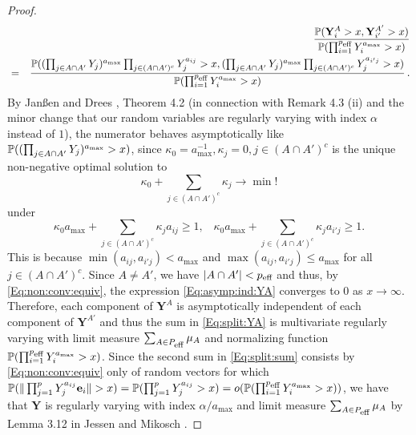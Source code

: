 \begin{proof}
\begin{eqnarray}\label{Eq:asymp:ind:YA} && \frac{\P(\mathbf{Y}^A_i>x,\mathbf{Y}^{A'}_{i'}>x)}{\P(\prod_{i=1}^{p_{\mbox{\scriptsize eff}}}Y_i^{a_{\max}}>x)}\\
\nonumber &=& \frac{\P((\prod_{j \in A \cap A'}Y_j)^{a_{\max}}\prod_{j \in (A \cap A')^c}Y_j^{a_{ij}}>x,(\prod_{j \in A \cap A'}Y_j)^{a_{\max}}\prod_{j \in (A \cap A')^c}Y_j^{a_{i'j}}>x)}{\P(\prod_{i=1}^{p_{\mbox{\scriptsize eff}}}Y_i^{a_{\max}}>x)}\,. 
\end{eqnarray}
By Jan\ss en and Drees \cite{janssen:drees:2016}, Theorem 4.2 (in connection with Remark 4.3 (ii) and the minor 
change that our random variables are regularly varying with index $\alpha$ instead of $1$), the numerator behaves asymptotically like $\P((\prod_{j \in A \cap A'}Y_j)^{a_{\max}}>x)$, since $\kappa_0=a_{\max}^{-1}, \kappa_{j}=0, j \in (A \cap A')^c$ is the unique non-negative optimal solution to
$$ \kappa_0+\sum_{j \in (A \cap A')^c} \kappa_j \to \min ! $$
under
$$\kappa_0 a_{\max}+\sum_{j \in (A \cap A')^c}\kappa_j a_{ij}\geq 1, \;\;\;  \kappa_0 a_{\max}+\sum_{j \in (A \cap A')^c}\kappa_j a_{i'j}\geq 1.$$
This is because $\min(a_{ij},a_{i'j})<a_{\max}$ and $\max(a_{ij},a_{i'j})\leq a_{\max}$ for all $j \in (A \cap A')^c$. Since $A \neq A'$, we have $|A \cap A'|<p_{\mbox{\scriptsize eff}}$ and thus, by \eqref{Eq:non:conv:equiv}, the expression \eqref{Eq:asymp:ind:YA} converges to 0 as $x \to \infty$. Therefore, each component of $\mathbf{Y}^A$ is asymptotically independent of each component of $\mathbf{Y}^{A'}$ and thus the sum in \eqref{Eq:split:YA} is multivariate regularly varying with limit measure $\sum_{A \in P_{\mbox{\scriptsize eff}}}\mu_A$ and normalizing function $\P(\prod_{i=1}^{p_{\mbox{\scriptsize eff}}}Y_i^{a_{\max}}>x)$. Since the second sum in \eqref{Eq:split:sum} consists by \eqref{Eq:non:conv:equiv} only of random vectors for which $\P(\|\prod_{j=1}^p Y_j^{a_{ij}} \mathbf{e}_i\|>x)=\P(\prod_{j=1}^p Y_j^{a_{ij}}>x) =o(\P(\prod_{i=1}^{p_{\mbox{\scriptsize eff}}}Y_i^{a_{\max}}>x))$, we have that $\mathbf{Y}$ is regularly varying with index $\alpha/a_{\max}$ and limit measure $\sum_{A \in P_{\mbox{\scriptsize eff}}}\mu_A$ by Lemma 3.12 in Jessen and Mikosch \cite{jessen:mikosch:2006}. 
\end{proof}
